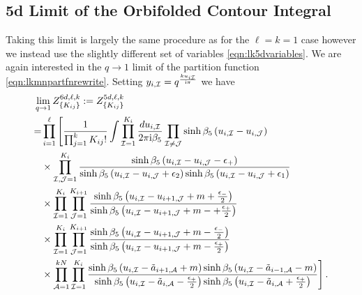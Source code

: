 \documentclass[main.tex]{subfiles}
\begin{document}
\subsection{5d Limit of the Orbifolded Contour Integral}
Taking this limit is largely the same procedure as for the $\ell=k=1$ case however we instead use the slightly different set of variables \eqref{eqn:lk5dvariables}.
We are again interested in the $q\to1$ limit of the partition function \eqref{eqn:lkmnpartfnrewrite}. Setting $y_{i,\mathcal{I}}=q^{\frac{ku_{i\mathcal{I}}}{\mathrm{i}\pi}}$ we have
\begin{align}
&\lim_{q\to1}Z^{6d,\ell,k}_{\{K_{ij}\}}:=Z^{5d,\ell,k}_{\{K_{ij}\}}\label{eqn:lknm5dpartitionfunction}\\
&\begin{aligned}
=&\prod_{i=1}^{\ell}\Bigg[\frac{1}{\prod_{j=1}^kK_{ij}!}\int\prod_{\mathcal{I}=1}^{K_{i}}\frac{du_{i,\mathcal{I}}}{2\pi\mathrm{i}\beta_5}\prod_{\mathcal{I}\neq \mathcal{J}}\sinh\beta_5\left(u_{i,\mathcal{I}}-u_{i,\mathcal{J}}\right)\\
&\times\prod_{\mathcal{I},\mathcal{J}=1}^{K_{i}}\frac{\sinh\beta_5\left(u_{i,\mathcal{I}}-u_{i,\mathcal{J}}-\epsilon_+\right)}{\sinh\beta_5\left(u_{i,\mathcal{I}}-u_{i,\mathcal{J}}+\epsilon_2\right)\sinh\beta_5\left(u_{i,\mathcal{I}}-u_{i,\mathcal{J}}+\epsilon_1\right)}\\
&\times\prod_{\mathcal{I}=1}^{K_{i}}\prod_{\mathcal{J}=1}^{K_{i+1}}\frac{\sinh\beta_5\left(u_{i,\mathcal{I}}-u_{i+1,\mathcal{J}}+m+\frac{\epsilon_-}{2}\right)}{\sinh\beta_5\left(u_{i,\mathcal{I}}-u_{i+1,\mathcal{J}}+m-+\frac{\epsilon_+}{2}\right)}\\
&\times\prod_{\mathcal{I}=1}^{K_{i}}\prod_{\mathcal{J}=1}^{K_{i+1}}\frac{\sinh\beta_5\left(u_{i,\mathcal{I}}-u_{i+1,\mathcal{J}}+m-\frac{\epsilon_-}{2}\right)}{\sinh\beta_5\left(u_{i,\mathcal{I}}-u_{i+1,\mathcal{J}}+m-\frac{\epsilon_+}{2}\right)}\\
&\times\prod_{\mathcal{A}=1}^{kN}\prod_{\mathcal{I}=1}^{K_{i}}\frac{\sinh\beta_5\left(u_{i,\mathcal{I}}-\tilde{a}_{i+1,\mathcal{A}}+m\right)\sinh\beta_5\left(u_{i,\mathcal{I}}-\tilde{a}_{i-1,\mathcal{A}}-m\right)}{\sinh\beta_5\left(u_{i,\mathcal{I}}-\tilde{a}_{i,\mathcal{A}}-\frac{\epsilon_+}{2}\right)\sinh\beta_5\left(u_{i,\mathcal{I}}-\tilde{a}_{i,\mathcal{A}}+\frac{\epsilon_+}{2}\right)}\Bigg]\,.
\end{aligned}
\end{align}
\end{document}
